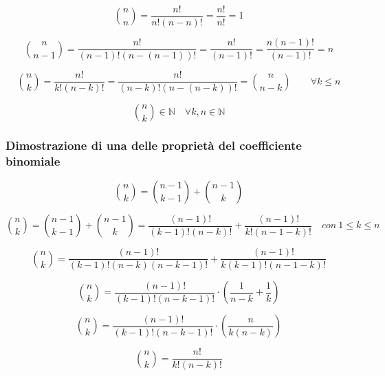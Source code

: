 \documentclass{article}
\begin{document}
\begin{equation*}
    \binom{n}{n} = \frac{n!}{n!(n - n)!} = \frac{n!}{n!} = 1
\end{equation*}

\begin{equation*}
    \binom{n}{n-1} = \frac{n!}{(n-1)!(n-(n-1))!} = \frac{n!}{(n-1)!} = \frac{n(n-1)!}{(n-1)!} = n
\end{equation*}

\begin{equation*}
    \binom{n}{k} = \frac{n!}{k!(n-k)!} = \frac{n!}{(n-k)!(n-(n-k))!} = \binom{n}{n-k} \qquad \forall k \leq n
\end{equation*}

\begin{equation*}
    \binom{n}{k} \in \mathbb{N} \quad \forall k,n \in \mathbb{N}
\end{equation*}

\subsubsection{Dimostrazione di una delle proprietà del coefficiente binomiale}
\begin{equation*}
    \binom{n}{k} = \binom{n-1}{k-1} + \binom{n-1}{k}
\end{equation*}

\begin{equation*}
    \binom{n}{k} = \binom{n-1}{k-1} + \binom{n-1}{k} = \frac{(n-1)!}{(k-1)!(n-k)!} + \frac{(n-1)!}{k!(n-1-k)!} \quad con \ 1 \leq k \leq n
\end{equation*}

\begin{equation*}
    \binom{n}{k} = \frac{(n-1)!}{(k-1)!(n-k)(n-k-1)!} + \frac{(n-1)!}{k(k-1)!(n-1-k)!}
\end{equation*}

\begin{equation*}
    \binom{n}{k} = \frac{(n-1)!}{(k-1)!(n-k-1)!} \cdot \left(\frac{1}{n-k} + \frac{1}{k}\right)
\end{equation*}

\begin{equation*}
    \binom{n}{k} = \frac{(n-1)!}{(k-1)!(n-k-1)!} \cdot \left(\frac{n}{k(n-k)}\right)
\end{equation*}

\begin{equation*}
    \binom{n}{k} = \frac{n!}{k!(n-k)!}
\end{equation*}
\end{document}
